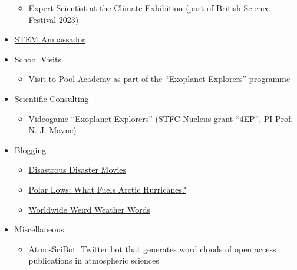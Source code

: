 \documentclass[a4paper, 11pt]{article}
\begin{document}
\begin{itemize}[nosep, leftmargin=10pt]
\begin{itemize}
        \item Expert Scientist at the \href{https://exetersciencecentre.org/exhibition-2023}{Climate Exhibition} (part of British Science Festival 2023)
    \end{itemize}
    \item \href{https://www.stem.org.uk/stem-ambassadors}{STEM Ambassador}
    \item School Visits
    \begin{itemize}
        \item Visit to Pool Academy as part of the \href{https://physics-astronomy.exeter.ac.uk/exoplanetexplorers/}{``Exoplanet Explorers'' programme}
    \end{itemize}
    \item Scientific Consulting
    \begin{itemize}
        \item \href{https://www.wethecurious.org/curious-stuff/stargazing-night-sky/exoplanet-explorers}{Videogame ``Exoplanet Explorers''} (STFC Nucleus grant ``4EP'', PI Prof. N. J. Mayne)
    \end{itemize}
    \item Blogging
    \begin{itemize}
        \item \href{http://www.scisnack.com/2015/12/17/disastrous-disaster-movies}{Disastrous Disaster Movies}
        \item \href{http://www.scisnack.com/2015/03/04/polar-lows-what-fuels-arctic-hurricanes}{Polar Lows: What Fuels Arctic Hurricanes?}
        \item \href{http://www.scisnack.com/2014/12/17/worldwide-weird-weather-words}{Worldwide Weird Weather Words}
    \end{itemize}
    \item Miscellaneous
    \begin{itemize}
        \item \href{https://twitter.com/atmosscibot}{AtmosSciBot}: Twitter bot that generates word clouds of open access publications in atmospheric sciences
    \end{itemize}
\end{itemize}

\end{document}
